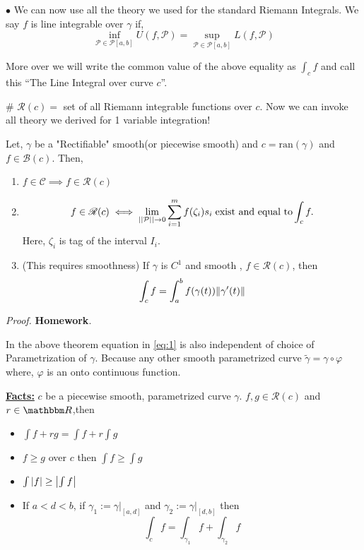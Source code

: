 \documentclass[Analysis-3]{subfiles}
\begin{document}
$\bullet$ We can now use all the theory we used for the standard Riemann Integrals. We say $f$ is line integrable over $\gamma$ if,
\[\inf_{\mathcal{P} \in \mathscr{P}[a,b]} U(f,\mathcal{P}) = \sup_{\mathcal{P} \in \mathscr{P}[a,b]} L(f,\mathcal{P})\]

More over we will write the common value of the above equality as $\int_c f$ and call this ``The Line Integral over curve $c$''.

\# \textbf{$\mathscr{R}(c)=$} set of all Riemann integrable functions over $c$. Now we can invoke all theory we derived for 1 variable integration!

\begin{Thm}{}{}\label{thm1:23}
    Let, $\gamma$ be a "Rectifiable" smooth(or piecewise smooth) and $c = \text{ran}(\gamma)$ and $f \in \mathscr{B}(c)$. Then,
    \begin{enumerate}
        \item $f \in \mathscr{C} \implies f \in \mathscr{R}(c)$
        \item \[ f \in \mathscr{R}(c) \iff \lim_{||\mathcal{P}||\to 0} \sum_{i=1}^{m} f(\zeta_i)s_i \hspace{0.1cm} \text{exist and equal to}\int_c f.\] Here, $\zeta_i$ is tag of the interval $I_i$.

        \item (This requires smoothness) If $\gamma$ is $C^1$ and smooth , $f \in \mathscr{R}(c)$, then
              \[\int_c f = \int_a^b f(\gamma(t))\norm{\gamma'(t)} \label{eq:1}\]

    \end{enumerate}
\end{Thm}

\textit{Proof.} \textbf{Homework}.

\vspace{0.2cm}

In the above theorem equation in \ref{eq:1} is also independent of choice of Parametrization of $\gamma$. Because any other smooth parametrized curve $\tilde{\gamma} = \gamma \circ \varphi$ where, $\varphi$ is an onto continuous function.

\vspace{1cm}

\textbf{\underline{Facts:}} $c$ be a piecewise smooth, parametrized curve $\gamma$. $f,g \in \mathscr{R}(c)$ and $r \in \R$,then
\begin{itemize}
    \item $\int f+rg = \int f + r\int g $
    \item $f \ge g$ over $c$ then $\int f \ge \int g$
    \item $\int \abs{f} \ge \abs{\int f}$
    \item If $a<d<b$, if $\gamma_1 := \gamma |_{[a,d]}$ and $\gamma_2 := \gamma |_{[d,b]}$ then
          \[\int_c f = \int_{\gamma_1}f + \int_{\gamma_2} f \]
\end{itemize}
\end{document}
